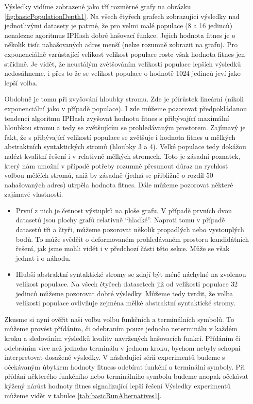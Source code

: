 Výsledky vidíme zobrazené jako tří rozměrné grafy na obrázku \ref{fig:basicPopulationDepth1}. Na všech čtyřech grafech
zobrazující výsledky nad jednotlivými datasety je patrné, že pro velmi malé populace (8 a 16 jedinců) nenalezne agoritmus
IPHash dobré hašovací funkce. Jejich hodnota fitnes je o několik tisíc nahašovaných adres menší (nelze rozumně zobrazit na grafu).
Pro exponenciálně vzrůstající velikost velikost populace roste však hodnota fitnes jen střídmě. Je vidět, že neustálým zvětšováním
velikosti populace lepších výsledků nedosáhneme, i přes to že se velikost populace o hodnotě 1024 jedinců jeví jako lepší volba.

Obdobně je tomu při zvyšování hloubky stromu. Zde je přírůstek lineární (nikoli exponenciální jako v případě populace). I zde můžeme
pozorovat předpokládanou tendenci algoritmu IPHash zvyšovat hodnotu fitnes s přibývající maximální hloubkou stromu a tedy se 
zvětšujícím se prohledávaným prostorem. Zajímavý je fakt, že s přibývající velikostí populace se zvětšuje i hodnota fitnes u mělkých
abstraktních syntaktických stromů (hloubky 3 a 4). Velké populace tedy dokážou nalézt kvalitní řešení i v relativně mělkých stromech.
Toto je zásadní poznatek, který nám umožní v případě potřeby rozumně přesunout důraz na rychlost volbou mělčích stromů, aniž by
zásadně (jedná se přibližně o rozdíl 50 nahašovaných adres) utrpěla hodnota fitnes. Dále můžeme pozorovat některé zajímavé vlastnosti. 

\begin{itemize}
	\item První z nich je četnost výstupků na ploše grafu. V případě prvních dvou datasetů jsou plochy grafů relativně ``hladké''. Naproti tomu v
		případě datasetů tři a čtyři, můžeme pozorovat několik propadlých nebo vystouplých bodů. To může svědčit o deformovaném
		prohledávaném prostoru kandidátních řešení, jak jsme mohli vidět i v předchozí části této sekce. Může se však jednat i o náhodu.
		
	\item Hlubší abstraktní syntaktické stromy se zdají být méně náchylné na zvolenou velikost populace. Na všech čtyřech datasetech již
		od velikosti populace 32 jedinců můžeme pozorovat dobré výsledky. Můžeme tedy tvrdit, že volba velikosti populace ovlivňuje zejména
		mělké abstraktní syntaktické stromy. 
\end{itemize}


Zkusme si nyní ověřit naši volbu volbu funkčních a terminálních symbolů. To můžeme provést přídáním, či odebraním 
pouze jednoho neterminálu v každém kroku a sledováním výsledků kvality navržených hašovacích funkcí. Přídáním či
odebráním více než jednoho terminálu v jednom kroku, bychom nebyly schopni interpretovat dosažené výsledky. V 
následující sérii experimentů budeme s očekávaným úbytkem hodnoty fitness odebírat funkční a terminální symboly.
Při přídání některého funkčního nebo terminálního symbolu budeme naopak očekávat kýžený nárůst hodnoty fitnes 
signalizující lepší řešení Výsledky experimentů můžeme vidět v tabulce \ref{tab:basicRunAlternatives1}.

